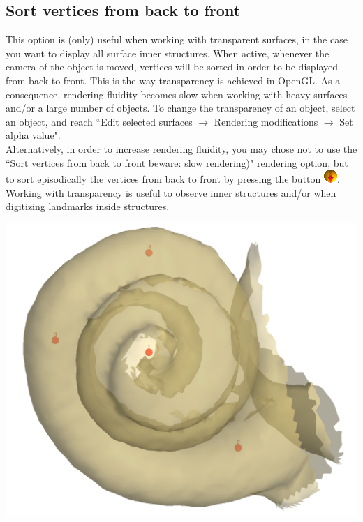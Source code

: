 \noindent
\begin{minipage}{0.55\textwidth}
\subsection{Sort vertices from back to front}\label{sort_back_front}
This option is (only) useful when working with transparent surfaces, in the case you want to display all surface inner structures. When active, whenever the camera of the
object is moved, vertices will be sorted in order to be displayed from back to front. This is the way transparency is achieved in OpenGL. As a consequence, rendering fluidity
becomes slow when working with heavy surfaces and/or a large number of objects. To change the transparency of an object, select an object, and reach ``Edit selected surfaces $\rightarrow$
Rendering modifications $\rightarrow$ Set alpha value".\\

Alternatively, in order to increase rendering fluidity, you may chose not to use the ``Sort vertices from back to front beware: slow rendering)" rendering option, but to sort episodically the vertices from back to front by pressing the button \includegraphics[scale=0.7]{images/pixmap/Sort_vertices01.png}.\\
Working with transparency is useful to observe inner structures and/or when digitizing landmarks
inside structures.

\end{minipage}  
 \begin{minipage}{0.45\textwidth}\centering

\includegraphics[scale=0.1]{images/Viewing_options/Sort_back_front.png}

 \end{minipage} 
\noindent


